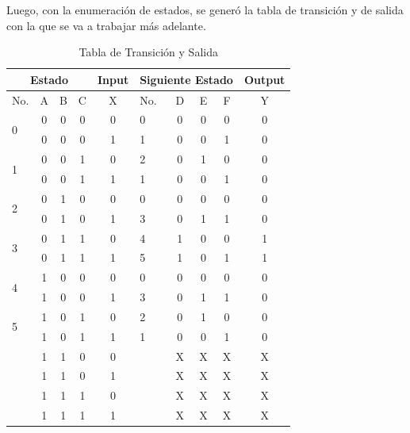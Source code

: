 \documentclass[11pt,letterpaper]{article}
\begin{document}
\newpage
Luego, con la enumeración de estados, se generó  la tabla de transición y de salida con la que se va a trabajar más adelante.
\begin{table}[h]
\centering
\caption{Tabla de Transición y Salida}
\vspace{0.2cm}
\label{tab_output}
\begin{tabular}{|l|c|c|c|c||l|c|c|c|c|}
\hline
\multicolumn{4}{|c|}{Estado}   & Input & \multicolumn{4}{l|}{Siguiente Estado} & Output \\ \hline
No.                & A & B & C & X      & No.       & D       & E      & F      &  Y      \\ \hline
\multirow{2}{*}{0} & 0 & 0 & 0 & 0     & 0         & 0       & 0      & 0      & 0      \\ \cline{2-10} 
                   & 0 & 0 & 0 & 1     & 1         & 0       & 0      & 1      & 0      \\ \hline
\multirow{2}{*}{1} & 0 & 0 & 1 & 0     & 2         & 0       & 1      & 0      & 0      \\ \cline{2-10} 
                   & 0 & 0 & 1 & 1     & 1         & 0       & 0      & 1      & 0      \\ \hline
\multirow{2}{*}{2} & 0 & 1 & 0 & 0     & 0         & 0       & 0      & 0      & 0      \\ \cline{2-10} 
                   & 0 & 1 & 0 & 1     & 3         & 0       & 1      & 1      & 0      \\ \hline
\multirow{2}{*}{3} & 0 & 1 & 1 & 0     & 4         & 1       & 0      & 0      & 1      \\ \cline{2-10} 
                   & 0 & 1 & 1 & 1     & 5         & 1       & 0      & 1      & 1      \\ \hline
\multirow{2}{*}{4} & 1 & 0 & 0 & 0     & 0         & 0       & 0      & 0      & 0      \\ \cline{2-10} 
                   & 1 & 0 & 0 & 1     & 3         & 0       & 1      & 1      & 0      \\ \hline
\multirow{2}{*}{5} & 1 & 0 & 1 & 0     & 2         & 0       & 1      & 0      & 0      \\ \cline{2-10} 
                   & 1 & 0 & 1 & 1     & 1         & 0       & 0      & 1      & 0      \\ \hline
\multirow{2}{*}{}  & 1 & 1 & 0 & 0     &           & X       & X      & X      & X      \\ \cline{2-10} 
                   & 1 & 1 & 0 & 1     &           & X       & X      & X      & X      \\ \hline
\multirow{2}{*}{}  & 1 & 1 & 1 & 0     &           & X       & X      & X      & X      \\ \cline{2-10} 
                   & 1 & 1 & 1 & 1     &           & X       & X      & X      & X      \\ \hline
\end{tabular}
\end{table}
\end{document}
